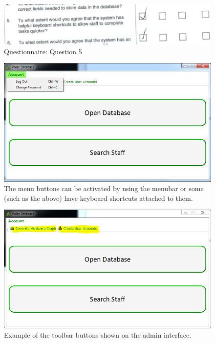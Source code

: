 \begin{figure}[H]
    \includegraphics[width=\textwidth]{./Evaluation/EvaluationQuestionnaire/5.png}
    \caption{Questionnaire: Question 5} 
\end{figure}

\begin{figure}[H]
    \includegraphics[width=\textwidth]{./Evaluation/Images/shortcuts1.png}
    \caption{The menu buttons can be activated by using the menubar or some (such as the above) have keyboard shortcuts attached to them.} 
\end{figure}

\begin{figure}[H]
    \includegraphics[width=\textwidth]{./Evaluation/Images/toolbarbtns.png}
    \caption{Example of the toolbar buttons shown on the admin interface.} 
\end{figure}

